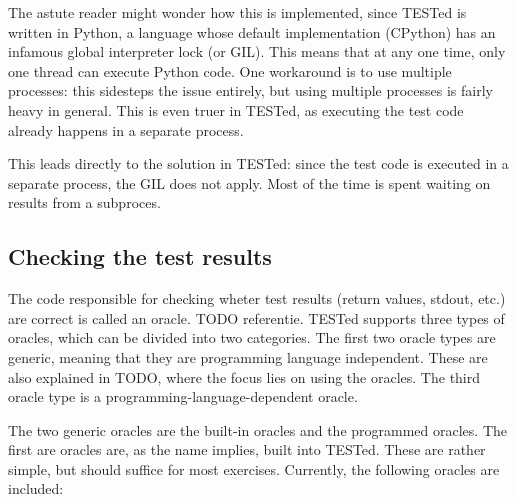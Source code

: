 \documentclass[../main]{subfiles}
\begin{document}
The astute reader might wonder how this is implemented, since TESTed is written in Python, a language whose default implementation (CPython) has an infamous global interpreter lock (or GIL).
This means that at any one time, only one thread can execute Python code.
One workaround is to use multiple processes: this sidesteps the issue entirely, but using multiple processes is fairly heavy in general.
This is even truer in TESTed, as executing the test code already happens in a separate process.

This leads directly to the solution in TESTed: since the test code is executed in a separate process, the GIL does not apply.
Most of the time is spent waiting on results from a subproces.

\subsection{Checking the test results}\label{subsec:checking-results}

The code responsible for checking wheter test results (return values, stdout, etc.) are correct is called an oracle. TODO referentie.
TESTed supports three types of oracles, which can be divided into two categories.
The first two oracle types are generic, meaning that they are programming language independent.
These are also explained in TODO, where the focus lies on using the oracles.
The third oracle type is a programming-language-dependent oracle.

The two generic oracles are the built-in oracles and the programmed oracles.
The first are oracles are, as the name implies, built into TESTed.
These are rather simple, but should suffice for most exercises.
Currently, the following oracles are included:
\end{document}
